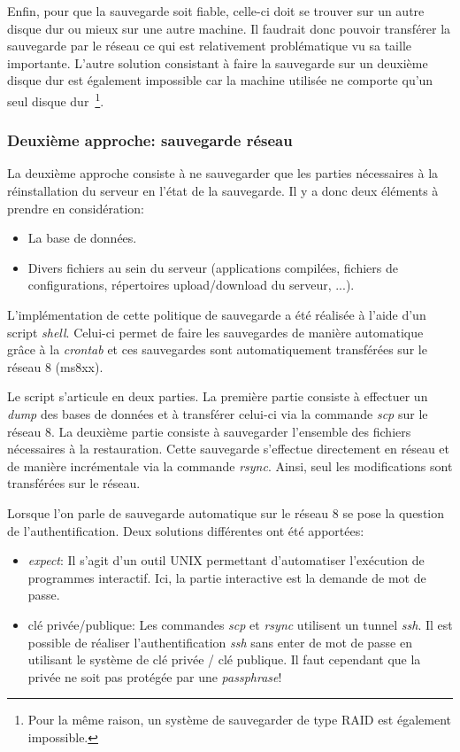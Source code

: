 \documentclass[a4paper, 11pt]{report}
\begin{document}
Enfin, pour que la sauvegarde soit fiable, celle-ci doit se trouver sur un autre disque dur ou mieux sur une autre machine. Il faudrait donc pouvoir transférer la sauvegarde par le réseau ce qui est relativement problématique vu sa taille importante. L'autre solution consistant à faire la sauvegarde sur un deuxième disque dur est également impossible car la machine utilisée ne comporte qu'un seul disque dur~\footnote{Pour la même raison, un système de sauvegarder de type RAID est également impossible.}. 

\subsubsection{Deuxième approche: sauvegarde réseau}
La deuxième approche consiste à ne sauvegarder que les parties nécessaires à la réinstallation du serveur en l'état de la sauvegarde. Il y a donc deux éléments à prendre en considération:
\begin{itemize}
\item La base de données.
\item Divers fichiers au sein du serveur (applications compilées, fichiers de configurations, répertoires upload/download du serveur, ...).
\end{itemize} 

L'implémentation de cette politique de sauvegarde a été réalisée à l'aide d'un script \textit{shell}. Celui-ci permet de faire les sauvegardes de manière automatique grâce à la \textit{crontab} et ces sauvegardes sont automatiquement transférées sur le réseau 8 (ms8xx). 

Le script s'articule en deux parties. La première partie consiste à effectuer un \textit{dump} des bases de données et à transférer celui-ci via la commande \textit{scp} sur le réseau 8. La deuxième partie consiste à sauvegarder l'ensemble des fichiers nécessaires à la restauration. Cette sauvegarde s'effectue directement en réseau et de manière incrémentale via la commande \textit{rsync}. Ainsi, seul les modifications sont transférées sur le réseau. %

Lorsque l'on parle de sauvegarde automatique sur le réseau 8 se pose la question de l'authentification. Deux solutions différentes ont été apportées:
\begin{itemize}
\item \textit{expect}: Il s'agit d'un outil UNIX permettant d'automatiser l'exécution de programmes interactif. Ici, la partie interactive est la demande de mot de passe.
\item clé privée/publique: Les commandes \textit{scp} et \textit{rsync} utilisent un tunnel \textit{ssh}. Il est possible de réaliser l'authentification \textit{ssh} sans enter de mot de passe en utilisant le système de clé privée / clé publique. Il faut cependant que la privée ne soit pas protégée par une \textit{passphrase}! 
\end{itemize}
\end{document}
